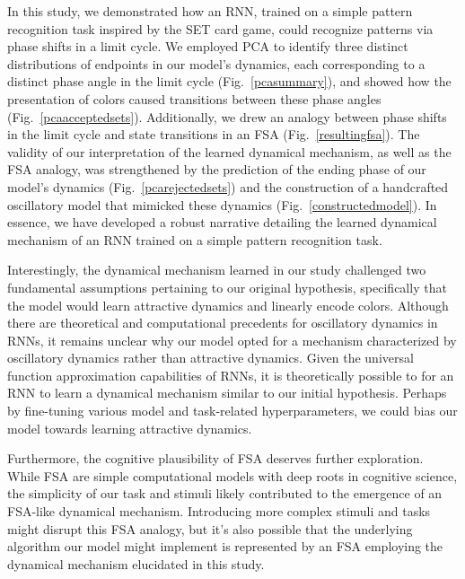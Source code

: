 \documentclass[conference]{IEEEtran}
\begin{document}
In this study, we demonstrated how an RNN, trained on a simple pattern recognition task inspired by the SET card game, could recognize patterns via phase shifts in a limit cycle. We employed PCA to identify three distinct distributions of endpoints in our model's dynamics, each corresponding to a distinct phase angle in the limit cycle (Fig.~\ref{pcasummary}), and showed how the presentation of colors caused transitions between these phase angles (Fig.~\ref{pcaacceptedsets}). Additionally, we drew an analogy between phase shifts in the limit cycle and state transitions in an FSA (Fig.~\ref{resultingfsa}). The validity of our interpretation of the learned dynamical mechanism, as well as the FSA analogy, was strengthened by the prediction of the ending phase of our model's dynamics (Fig.~\ref{pcarejectedsets}) and the construction of a handcrafted oscillatory model that mimicked these dynamics (Fig.~\ref{constructedmodel}). In essence, we have developed a robust narrative detailing the learned dynamical mechanism of an RNN trained on a simple pattern recognition task.

Interestingly, the dynamical mechanism learned in our study challenged two fundamental assumptions pertaining to our original hypothesis, specifically that the model would learn attractive dynamics and linearly encode colors. Although there are theoretical\cite{hoppensteadt1999oscillatory} and computational\cite{kay2022neural,pals2023trained} precedents for oscillatory dynamics in RNNs, it remains unclear why our model opted for a mechanism characterized by oscillatory dynamics rather than attractive dynamics. Given the universal function approximation capabilities of RNNs\cite{funahashi1993approximation}, it is theoretically possible to for an RNN to learn a dynamical mechanism similar to our initial hypothesis. Perhaps by fine-tuning various model and task-related hyperparameters, we could bias our model towards learning attractive dynamics\cite{schaeffer2022no}.

Furthermore, the cognitive plausibility of FSA deserves further exploration. While FSA are simple computational models with deep roots in cognitive science\cite{chomsky1957syntactic}, the simplicity of our task and stimuli likely contributed to the emergence of an FSA-like dynamical mechanism. Introducing more complex stimuli and tasks might disrupt this FSA analogy, but it's also possible that the underlying algorithm our model might implement is represented by an FSA employing the dynamical mechanism elucidated in this study.
\end{document}
